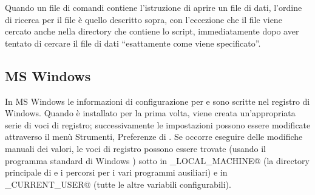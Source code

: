 Quando un file di comandi contiene l'istruzione di aprire un file di
dati, l'ordine di ricerca per il file è quello descritto sopra, con
l'eccezione che il file viene cercato anche nella directory che
contiene lo script, immediatamente dopo aver tentato di cercare il
file di dati ``esattamente come viene specificato''.
      

\subsection{MS Windows}
\label{MS-behave}

In MS Windows le informazioni di configurazione per  e
 sono scritte nel registro di Windows. Quando
 è installato per la prima volta, viene creata
un'appropriata serie di voci di registro; successivamente le
impostazioni possono essere modificate attraverso il menù
\textsf{Strumenti, Preferenze} di . Se occorre eseguire
delle modifiche manuali dei valori, le voci di registro possono essere
trovate (usando il programma standard di Windows )
sotto \verb@Software\gretl@ in \verb@HKEY_LOCAL_MACHINE@ (la directory
principale di  e i percorsi per i vari programmi ausiliari)
e in \verb@HKEY_CURRENT_USER@ (tutte le altre variabili
configurabili).
          

